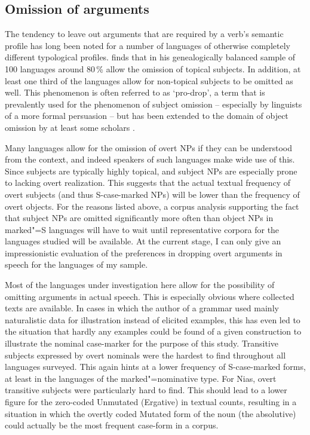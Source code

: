 \subsection{Omission of arguments}\label{omitarg}

The tendency to leave out arguments that are required by a verb's semantic profile has long been noted for a number of languages of otherwise completely different typological profiles. \citet[131--132]{Gilligan:1987} finds that in his genealogically balanced sample of 100 languages around 80\,\% allow the omission of topical subjects. 
In addition, at least one third of the languages allow for non-topical subjects to be omitted as well. 
This phenomenon is often referred to as `pro-drop', a term that is prevalently used for the phenomenon of subject omission -- especially by linguists of a more formal persuasion -- but has been extended to the domain of object omission by at least some scholars \citep[e.g.][]{Rizzi:1986}. 

Many languages allow for the omission of overt NPs if they can be understood from the context, and indeed speakers of such languages make wide use of this.
Since subjects are typically highly topical, and subject NPs are especially prone to lacking overt realization. 
This suggests that the actual textual frequency of overt subjects (and thus S-case-marked NPs) will be lower than the frequency of overt objects. 
For the reasons listed above, a corpus analysis supporting the fact that subject NPs are omitted significantly more often than object NPs in marked"=S languages will have to wait until representative corpora for the languages studied will be available. 
At the current stage, I can only give an impressionistic evaluation of the preferences in dropping overt arguments in speech for the languages of my sample. 

Most of the languages under investigation here allow for the possibility of omitting arguments in actual speech. 
This is especially obvious where collected texts are available. 
In cases in which the author of a grammar used mainly naturalistic data for illustration instead of elicited examples, this has even led to the situation that hardly any examples could be found of a given construction to illustrate the nominal case-marker for the purpose of this study. 
Transitive subjects expressed by overt nominals were the hardest to find throughout all languages surveyed. 
This again hints at a lower frequency of S-case-marked forms, at least in the languages of the marked"=nominative type. 
For Nias, overt transitive subjects were particularly hard to find.
This should lead to a lower figure for the zero-coded Unmutated (Ergative) in textual counts, resulting in a situation in which the overtly coded Mutated form of the noun (the absolutive) could actually be the most frequent case-form in a corpus.

